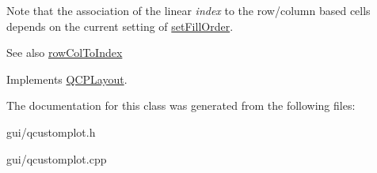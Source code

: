 Note that the association of the linear {\itshape index} to the row/column based cells depends on the current setting of \hyperlink{classQCPLayoutGrid_affc2f3cfd22f28698c5b29b960d2a391}{set\+Fill\+Order}.

\begin{DoxySeeAlso}{See also}
\hyperlink{classQCPLayoutGrid_a682ba76f130810ffd294032a1bfbcfcb}{row\+Col\+To\+Index} 
\end{DoxySeeAlso}


Implements \hyperlink{classQCPLayout_a5a79621fa0a6eabb8b520cfc04fb601a}{Q\+C\+P\+Layout}.



The documentation for this class was generated from the following files\+:\begin{DoxyCompactItemize}
\item 
gui/qcustomplot.\+h\item 
gui/qcustomplot.\+cpp\end{DoxyCompactItemize}
